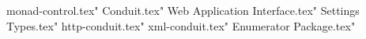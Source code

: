 
\appendix

 monad-control.tex"
 Conduit.tex"
 Web Application Interface.tex"
 Settings Types.tex"
 http-conduit.tex"
 xml-conduit.tex"
 Enumerator Package.tex"


